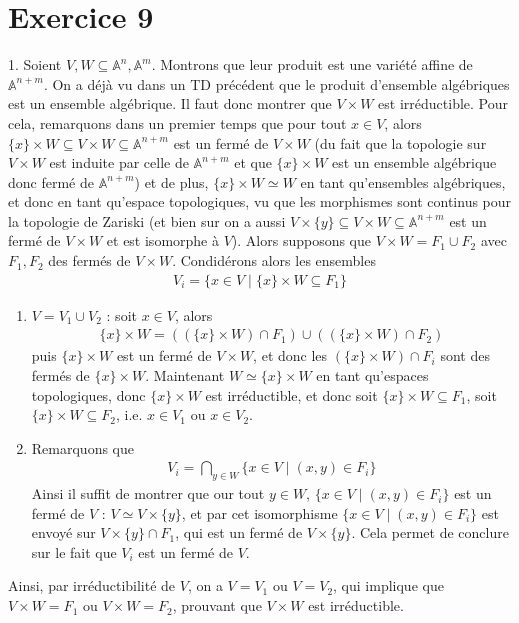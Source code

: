     \section{Exercice 9}
        \begin{question}{1.}
            Soient $V,W \subseteq \mathbb{A}^n, \mathbb{A}^m$. Montrons que leur produit est une variété affine de $\mathbb{A}^{n+m}$. On a déjà vu dans un TD précédent que le produit d'ensemble algébriques est un ensemble algébrique. Il faut donc montrer que $V \times W$ est irréductible. Pour cela, remarquons dans un premier temps que pour tout $x \in V$, alors $\{x\} \times W \subseteq V \times W \subseteq \mathbb{A}^{n + m}$ est un fermé de $V \times W$ (du fait que la topologie sur $V \times W$ est induite par celle de $\mathbb{A}^{n + m}$ et que $\{x\} \times W$ est un ensemble algébrique donc fermé de $\mathbb{A}^{n + m}$) et de plus, $\{x\} \times W \simeq W$ en tant qu'ensembles algébriques, et donc en tant qu'espace topologiques, vu que les morphismes sont continus pour la topologie de Zariski (et bien sur on a aussi $V \times \{y\} \subseteq V \times W \subseteq \mathbb{A}^{n + m}$ est un fermé de $V \times W$ et est isomorphe à $V$). Alors supposons que $V \times W = F_1 \cup F_2$ avec $F_1, F_2$ des fermés de $V \times W$. Condidérons alors les ensembles
            \begin{align*}
                V_i = \{x \in V \mid \{x\} \times W \subseteq F_1\}
            \end{align*}
            \begin{enumerate}
                \item $V = V_1 \cup V_2$ : soit $x \in V$, alors
                \begin{align*}
                    \{x\} \times W = ((\{x\} \times W) \cap F_1) \cup ((\{x\} \times W) \cap F_2)
                \end{align*}
                puis $\{x\} \times W$ est un fermé de $V \times W$, et donc les $(\{x\} \times W) \cap F_i$ sont des fermés de $\{x\} \times W$. Maintenant $W \simeq \{x\} \times W$ en tant qu'espaces topologiques, donc $\{x\} \times W$ est irréductible, et donc soit $\{x\} \times W \subseteq F_1$, soit $\{x\} \times W \subseteq F_2$, i.e. $x \in V_1$ ou $x \in V_2$. 
                \item Remarquons que 
                \begin{align*}
                    V_i = \bigcap_{y \in W} \{x \in V \mid (x,y) \in F_i\}
                \end{align*}
                Ainsi il suffit de montrer que our tout $y \in W$, $\{x \in V \mid (x,y) \in F_i\}$ est un fermé de $V$ : $V \simeq V \times \{y\}$, et par cet isomorphisme $\{x \in V \mid (x,y) \in F_i\}$ est envoyé sur $V \times \{y\} \cap F_1$, qui est un fermé de $V \times \{y\}$. Cela permet de conclure sur le fait que $V_i$ est un fermé de $V$.
            \end{enumerate}
            Ainsi, par irréductibilité de $V$, on a $V = V_1$ ou $V = V_2$, qui implique que $V \times W = F_1$ ou $V \times W = F_2$, prouvant que $V \times W$ est irréductible.
        \end{question}
